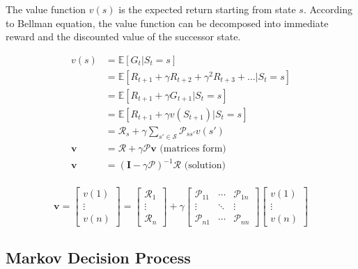 \noindent The value function $v(s)$ is the expected return starting from state $s$.
According to Bellman equation, the value function can be decomposed into
immediate reward and the discounted value of the successor state.

\begin{align*}
    v(s)       & = \mathbb{E}[G_t | S_t = s]                                                  \\
               & = \mathbb{E}[R_{t+1} + \gamma R_{t+2} + \gamma^2 R_{t+3} + \ldots | S_t = s] \\
               & = \mathbb{E}[R_{t+1} + \gamma G_{t+1} | S_t = s]                             \\
               & = \mathbb{E}[R_{t+1} + \gamma v(S_{t+1}) | S_t = s]                          \\
               & = \mathcal{R}_s + \gamma \sum_{s' \in \mathcal{S}} \mathcal{P}_{ss'} v(s')   \\
    \mathbf{v} & = \mathcal{R} + \gamma \mathcal{P} \mathbf{v} \text{  (matrices form)}       \\
    \mathbf{v} & = (\mathbf{I} - \gamma \mathcal{P})^{-1} \mathcal{R} \text{  (solution)}     \\
\end{align*}

\[
    \mathbf{v} =
    \begin{bmatrix}
        v(1)   \\
        \vdots \\
        v(n)
    \end{bmatrix} =
    \begin{bmatrix}
        \mathcal{R}_1 \\
        \vdots        \\
        \mathcal{R}_n
    \end{bmatrix}
    +
    \gamma
    \begin{bmatrix}
        \mathcal{P}_{11} & \cdots & \mathcal{P}_{1n} \\
        \vdots           & \ddots & \vdots           \\
        \mathcal{P}_{n1} & \cdots & \mathcal{P}_{nn}
    \end{bmatrix}
    \begin{bmatrix}
        v(1)   \\
        \vdots \\
        v(n)
    \end{bmatrix}
\]

\subsection{Markov Decision Process}

